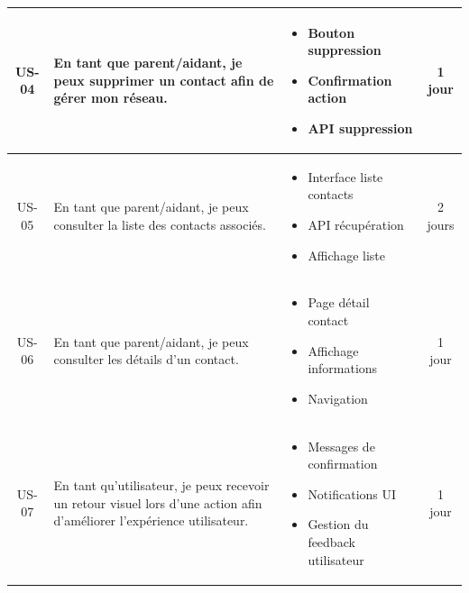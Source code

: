 \begin{table}[H]
\begin{tabularx}{\textwidth}{|c|>{\raggedright\arraybackslash}X|>{\raggedright\arraybackslash}X|c|}
US-04 & En tant que parent/aidant, je peux supprimer un contact afin de gérer mon réseau.
& \begin{minipage}[t]{\linewidth}\setlength{\itemsep}{-2pt}
\begin{itemize}[leftmargin=*]
\item Bouton suppression
\item Confirmation action
\item API suppression
\end{itemize}
\end{minipage}
& 1 jour \\
\hline

US-05 & En tant que parent/aidant, je peux consulter la liste des contacts associés.
& \begin{minipage}[t]{\linewidth}\setlength{\itemsep}{-2pt}
\begin{itemize}[leftmargin=*]
\item Interface liste contacts
\item API récupération
\item Affichage liste
\end{itemize}
\end{minipage}
& 2 jours \\
\hline

US-06 & En tant que parent/aidant, je peux consulter les détails d'un contact.
& \begin{minipage}[t]{\linewidth}\setlength{\itemsep}{-2pt}
\begin{itemize}[leftmargin=*]
\item Page détail contact
\item Affichage informations
\item Navigation
\end{itemize}
\end{minipage}
& 1 jour \\
\hline

US-07 & En tant qu'utilisateur, je peux recevoir un retour visuel lors d'une action afin d'améliorer l'expérience utilisateur.
& \begin{minipage}[t]{\linewidth}\setlength{\itemsep}{-2pt}
\begin{itemize}[leftmargin=*]
\item Messages de confirmation
\item Notifications UI
\item Gestion du feedback utilisateur
\end{itemize}
\end{minipage}
& 1 jour \\
\hline


\end{tabularx}
\end{table}
